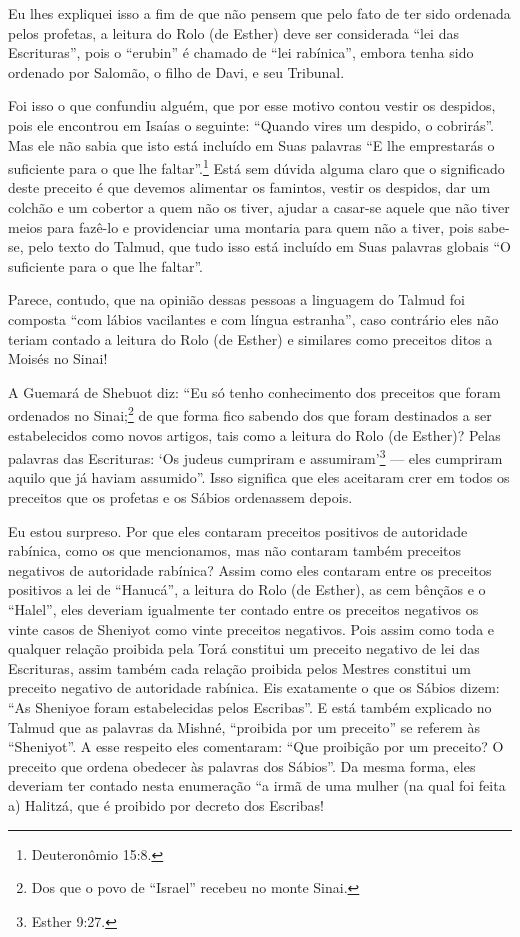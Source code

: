 Eu lhes expliquei isso a fim de que não pensem que pelo fato de ter sido
ordenada pelos profetas, a leitura do Rolo (de Esther) deve ser
considerada ``lei das Escrituras'', pois o ``erubin'' é chamado de
``lei rabínica'', embora tenha sido ordenado por Salomão, o filho de
Davi, e seu Tribunal.

Foi isso o que confundiu alguém, que por esse motivo contou vestir os
despidos, pois ele encontrou em Isaías o seguinte: ``Quando vires um
despido, o cobrirás''. Mas ele não sabia que isto está incluído em Suas
palavras ``E lhe emprestarás o suficiente para o que lhe faltar''.\footnote{Deuteronômio 15:8.} Está sem dúvida alguma claro que o significado
deste preceito é que devemos alimentar os famintos, vestir os despidos,
dar um colchão e um cobertor a quem não os tiver, ajudar a casar-se
aquele que não tiver meios para fazê-lo e providenciar uma montaria
para quem não a tiver, pois sabe-se, pelo texto do Talmud, que tudo
isso está incluído em Suas palavras globais ``O suficiente para o que
lhe faltar''.

Parece, contudo, que na opinião dessas pessoas a linguagem do Talmud
foi composta ``com lábios vacilantes e com língua estranha'', caso
contrário eles não teriam contado a leitura do Rolo (de Esther) e
similares como preceitos ditos a Moisés no Sinai!

A Guemará de Shebuot diz: ``Eu só tenho conhecimento dos preceitos que foram ordenados no Sinai;\footnote{Dos que o povo de ``Israel'' recebeu no monte Sinai.} de que forma fico sabendo dos que foram
destinados a ser estabelecidos como novos artigos, tais como a leitura
do Rolo
(de Esther)? Pelas palavras das Escrituras: `Os judeus cumpriram e
assumiram'\footnote{Esther 9:27.} --- eles cumpriram aquilo que já haviam
assumido''. Isso significa que eles aceitaram crer em todos os preceitos
que os profetas e os Sábios ordenassem depois.

Eu estou surpreso. Por que eles contaram preceitos positivos de
autoridade rabínica, como os que mencionamos, mas não contaram também
preceitos negativos de autoridade rabínica? Assim como eles contaram
entre os preceitos positivos a lei de ``Hanucá'', a leitura do Rolo (de
Esther), as cem bênçãos e o ``Halel'', eles deveriam igualmente ter
contado entre os preceitos negativos os vinte casos de
Sheniyot\starr{} como vinte preceitos negativos. Pois
assim como toda e qualquer relação proibida pela Torá constitui um
preceito negativo de lei das Escrituras, assim também cada relação
proibida pelos Mestres constitui um preceito negativo de autoridade
rabínica. Eis exatamente o que os Sábios dizem: ``As
Sheniyoe foram estabelecidas pelos Escribas''. E
está também explicado no Talmud que as palavras da Mishné,
``proibida por um preceito'' se referem às ``Sheniyot''. A esse respeito
eles comentaram: ``Que proibição por um preceito? O preceito que ordena
obedecer às palavras dos Sábios''. Da mesma forma, eles deveriam ter
contado nesta enumeração ``a irmã de uma mulher (na qual foi feita a)
Halitzá, que é proibido por decreto dos Escribas!


